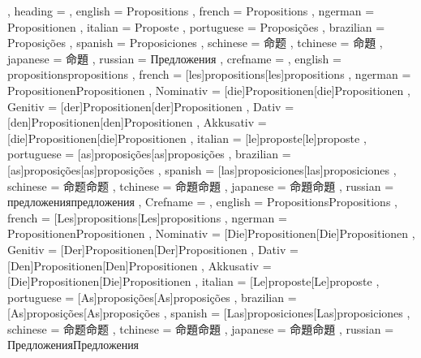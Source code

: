   {
    , heading =   {
                    , english     = Propositions
                    , french      = Propositions
                    , ngerman     = Propositionen
                    , italian     = Proposte
                    , portuguese  = Proposições
                    , brazilian   = Proposições
                    , spanish     = Proposiciones
                    , schinese    = 命题
                    , tchinese    = 命題
                    , japanese    = 命題
                    , russian     = Предложения
                  }
    , crefname =  {
                    , english     = {propositions}{propositions}
                    , french      = [les]{propositions}[les]{propositions}
                    , ngerman     = { {Propositionen}{Propositionen}
                                      , Nominativ = [die]{Propositionen}[die]{Propositionen}
                                      , Genitiv   = [der]{Propositionen}[der]{Propositionen}
                                      , Dativ     = [den]{Propositionen}[den]{Propositionen}
                                      , Akkusativ = [die]{Propositionen}[die]{Propositionen}
                                    }
                    , italian     = [le]{proposte}[le]{proposte}
                    , portuguese  = [as]{proposições}[as]{proposições}
                    , brazilian   = [as]{proposições}[as]{proposições}
                    , spanish     = [las]{proposiciones}[las]{proposiciones}
                    , schinese    = {命题}{命题}
                    , tchinese    = {命題}{命題}
                    , japanese    = {命題}{命題}
                    , russian     = {предложения}{предложения}
                  }
    , Crefname =  {
                    , english     = {Propositions}{Propositions}
                    , french      = [Les]{propositions}[Les]{propositions}
                    , ngerman     = { {Propositionen}{Propositionen}
                                      , Nominativ = [Die]{Propositionen}[Die]{Propositionen}
                                      , Genitiv   = [Der]{Propositionen}[Der]{Propositionen}
                                      , Dativ     = [Den]{Propositionen}[Den]{Propositionen}
                                      , Akkusativ = [Die]{Propositionen}[Die]{Propositionen}
                                    }
                    , italian     = [Le]{proposte}[Le]{proposte}
                    , portuguese  = [As]{proposições}[As]{proposições}
                    , brazilian   = [As]{proposições}[As]{proposições}
                    , spanish     = [Las]{proposiciones}[Las]{proposiciones}
                    , schinese    = {命题}{命题}
                    , tchinese    = {命題}{命題}
                    , japanese    = {命題}{命題}
                    , russian     = {Предложения}{Предложения}
                  }
  }

